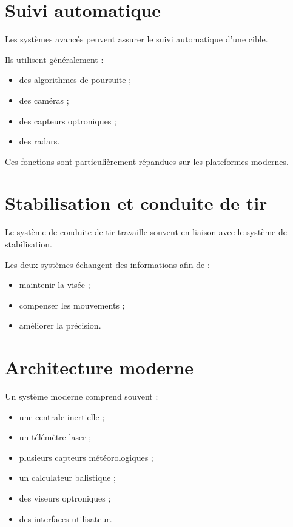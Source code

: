 \section{Suivi automatique}

Les systèmes avancés peuvent assurer le suivi automatique d'une cible.

Ils utilisent généralement :

\begin{itemize}
    \item des algorithmes de poursuite ;
    \item des caméras ;
    \item des capteurs optroniques ;
    \item des radars.
\end{itemize}

Ces fonctions sont particulièrement répandues sur les plateformes modernes.

\section{Stabilisation et conduite de tir}

Le système de conduite de tir travaille souvent en liaison avec le système
de stabilisation.

Les deux systèmes échangent des informations afin de :

\begin{itemize}
    \item maintenir la visée ;
    \item compenser les mouvements ;
    \item améliorer la précision.
\end{itemize}

\section{Architecture moderne}

Un système moderne comprend souvent :

\begin{itemize}
    \item une centrale inertielle ;
    \item un télémètre laser ;
    \item plusieurs capteurs météorologiques ;
    \item un calculateur balistique ;
    \item des viseurs optroniques ;
    \item des interfaces utilisateur.
\end{itemize}

